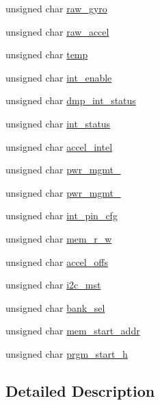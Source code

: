 \begin{DoxyCompactItemize}
unsigned char \hyperlink{structgyro__reg__s_a1366c90aec04a4e1d212de76d3f0b6cc}{raw\+\_\+gyro}
\item 
unsigned char \hyperlink{structgyro__reg__s_a3a78e67f9066b6b8601f375fcaadf005}{raw\+\_\+accel}
\item 
unsigned char \hyperlink{structgyro__reg__s_abe413cb96d839cbe31417aa52d920f21}{temp}
\item 
unsigned char \hyperlink{structgyro__reg__s_ab0cc290f4f43cd8a8b6562a97f540493}{int\+\_\+enable}
\item 
unsigned char \hyperlink{structgyro__reg__s_a5362f39039c1bbcc9aaa5a973eb762da}{dmp\+\_\+int\+\_\+status}
\item 
unsigned char \hyperlink{structgyro__reg__s_a39621694d9d5d0c0488c66fa8d088562}{int\+\_\+status}
\item 
unsigned char \hyperlink{structgyro__reg__s_a9c4b97b2bf0f2fcee9538e74fcaf5c3f}{accel\+\_\+intel}
\item 
unsigned char \hyperlink{structgyro__reg__s_ad746a196c317f0f4d557a92b9eb98d34}{pwr\+\_\+mgmt\+\_}
\item 
unsigned char \hyperlink{structgyro__reg__s_adc9ae0e35f199b3349174ac09e219ecb}{pwr\+\_\+mgmt\+\_}
\item 
unsigned char \hyperlink{structgyro__reg__s_a135c6ee7cb6bdbf6ef9471ce5a6e1724}{int\+\_\+pin\+\_\+cfg}
\item 
unsigned char \hyperlink{structgyro__reg__s_a1e6aa9b45ef18f1e5f6369c6383e1f0f}{mem\+\_\+r\+\_\+w}
\item 
unsigned char \hyperlink{structgyro__reg__s_a29bdc7a4514a6d9714e6f95958272a21}{accel\+\_\+offs}
\item 
unsigned char \hyperlink{structgyro__reg__s_af48ab798d6b786068dfbba8bb176bf1e}{i2c\+\_\+mst}
\item 
unsigned char \hyperlink{structgyro__reg__s_ac5fa957c7e1347ce8cf61f4a5fc52a5c}{bank\+\_\+sel}
\item 
unsigned char \hyperlink{structgyro__reg__s_ae2cfd68006c94f82add6eab04990c73b}{mem\+\_\+start\+\_\+addr}
\item 
unsigned char \hyperlink{structgyro__reg__s_a0813e85e389743e828cc84c5b903ada1}{prgm\+\_\+start\+\_\+h}
\end{DoxyCompactItemize}


\subsection{Detailed Description}


